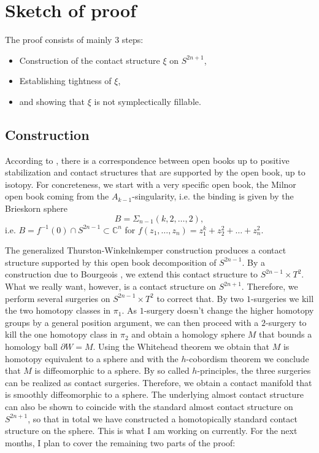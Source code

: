 \documentclass{amsart}
\begin{document}
\section*{Sketch of proof}
The proof consists of mainly 3 steps:
\begin{itemize}
    \item Construction of the contact structure $\xi$ on $S^{2n+1}$,
    \item Establishing tightness of $\xi$,
    \item and showing that $\xi$ is not symplectically fillable.
\end{itemize}
\subsection*{Construction}
According to \cite{Giroux02}, there is a correspondence between open books up to positive
stabilization and contact structures that are supported by the open book, up to isotopy.
For concreteness, we start with a very specific open book, the Milnor open book coming from
the $A_{k-1}$-singularity, i.e. the binding is given by the Brieskorn sphere 
\[
    B = \Sigma_{n-1}(k,2,\dots,2),
\]
i.e. $B = f^{-1}(0) \cap S^{2n-1} \subset \mathbb C^n$ for $f(z_1, \dots, z_n) = z_1^k + z_2^2 + \dots + z_n^2$.

The generalized Thurston-Winkelnkemper construction produces a contact structure supported by
this open book decomposition of $S^{2n-1}$.
By a construction due to Bourgeois \cite{Bourgeois02}, we extend this contact structure to 
$S^{2n-1} \times T^2$.
What we really want, however, is a contact structure on $S^{2n+1}$. Therefore,
we perform several surgeries on $S^{2n-1}\times T^2$ to correct that.
By two $1$-surgeries we kill the two homotopy classes in $\pi_1$.
As $1$-surgery doesn't change the higher homotopy groups by a general position argument,
we can then proceed with a $2$-surgery to kill the one homotopy class in $\pi_2$
and obtain a homology sphere $M$ that bounds a homology ball $\partial W = M$.
Using the Whitehead theorem we obtain that $M$ is homotopy equivalent to a sphere 
and with the $h$-cobordism theorem we conclude that $M$ is diffeomorphic to a sphere.
By so called $h$-principles, the three surgeries can be realized as contact surgeries.
Therefore, we obtain a contact manifold that is smoothly diffeomorphic to a sphere.
The underlying almost contact structure can also be shown to coincide with the standard almost
contact structure on $S^{2n+1}$, so that in total we have constructed a
homotopically standard contact structure on the sphere.
This is what I am working on currently. For the next months, I plan to cover the remaining
two parts of the proof:
\end{document}
